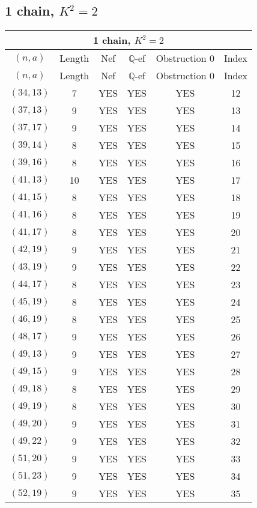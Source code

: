 \subsection{1 chain, $K^2 = 2$}
\begin{longtable}{|c|c|c|c|c|c|}
\hline
\multicolumn{6}{|c|}{1 chain, $K^2 = 2$}\\
\hline
$(n,a)$ & Length & Nef & $\mathbb Q$-ef & Obstruction 0 & Index\\
\hline
\endfirsthead

\hline
$(n,a)$ & Length & Nef & $\mathbb Q$-ef & Obstruction 0 & Index\\
\hline
\endhead
\hline
\endfoot

$(34, 13)$ & 7 & YES & YES & YES & 12\\
$(37, 13)$ & 9 & YES & YES & YES & 13\\
$(37, 17)$ & 9 & YES & YES & YES & 14\\
$(39, 14)$ & 8 & YES & YES & YES & 15\\
$(39, 16)$ & 8 & YES & YES & YES & 16\\
$(41, 13)$ & 10 & YES & YES & YES & 17\\
$(41, 15)$ & 8 & YES & YES & YES & 18\\
$(41, 16)$ & 8 & YES & YES & YES & 19\\
$(41, 17)$ & 8 & YES & YES & YES & 20\\
$(42, 19)$ & 9 & YES & YES & YES & 21\\
$(43, 19)$ & 9 & YES & YES & YES & 22\\
$(44, 17)$ & 8 & YES & YES & YES & 23\\
$(45, 19)$ & 8 & YES & YES & YES & 24\\
$(46, 19)$ & 8 & YES & YES & YES & 25\\
$(48, 17)$ & 9 & YES & YES & YES & 26\\
$(49, 13)$ & 9 & YES & YES & YES & 27\\
$(49, 15)$ & 9 & YES & YES & YES & 28\\
$(49, 18)$ & 8 & YES & YES & YES & 29\\
$(49, 19)$ & 8 & YES & YES & YES & 30\\
$(49, 20)$ & 9 & YES & YES & YES & 31\\
$(49, 22)$ & 9 & YES & YES & YES & 32\\
$(51, 20)$ & 9 & YES & YES & YES & 33\\
$(51, 23)$ & 9 & YES & YES & YES & 34\\
$(52, 19)$ & 9 & YES & YES & YES & 35\\

\end{longtable}
